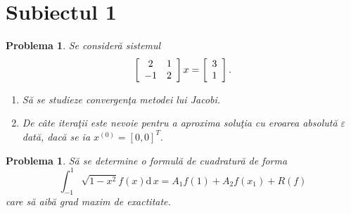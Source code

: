 \documentclass{article}%
\newtheorem{problem}[theorem]{Problema}
\begin{document}
\section{Subiectul 1}
 
\begin{problem}
Se consider\u{a} sistemul%
\[
\left[
\begin{array}
[c]{cc}%
2 & 1\\
-1 & 2
\end{array}
\right]  x=\left[
\begin{array}
[c]{c}%
3\\
1
\end{array}
\right]  .
\]


\begin{enumerate}
\item S\u{a} se studieze convergen\c{t}a metodei lui Jacobi.

\item De c\^{a}te itera\c{t}ii este nevoie pentru a aproxima solu\c{t}ia cu
eroarea absolut\u{a} $\varepsilon$ dat\u{a}, dac\u{a} se ia $x^{(0)}%
=[0,0]^{T}.$
\end{enumerate}
\end{problem}

\begin{problem}
S\u{a} se determine o formul\u{a} de cuadratur\u{a} de forma
\[
\int_{-1}^{1}\sqrt{1-x^{2}}f(x)\mathrm{d}\,x=A_{1}f(1)+A_{2}f(x_{1})+R(f)
\]
care s\u{a} aib\u{a} grad maxim de exactitate.
\end{problem}
\end{document}
